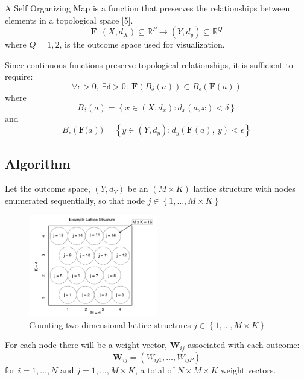 \documentclass[12pt,]{article}
\begin{document}
A Self Organizing Map is a function that preserves the relationships
between elements in a topological space {[}5{]}.
\[\mathbf{F}: (X, d_{X}) \subseteq \mathbb{R}^{P} \longrightarrow  (Y, d_{y}) \subseteq \mathbb{R}^{Q}\]
where \(Q=1,2\), is the outcome space used for visualization.

Since continuous functions preserve topological relationships, it is
sufficient to require:
\[\forall \epsilon>0, \ \exists \delta>0: \ \mathbf{F}\left(B_{\delta}\left(a\right) \right) \subset B_{\epsilon}\left(\mathbf{F}(a)\right)  \]
where
\[B_{\delta}\left(a\right)  = \left \{ x \in (X, d_{x}) : d_{x}\left(a,x \right) < \delta  \right \}\]
and
\[B_{\epsilon}\left(\mathbf{F}(a\right))  = \left \{ y \in (Y, d_{y}) : d_{y}\left(\mathbf{F}(a),\ y \right) < \epsilon  \right \}\]

\hypertarget{algorithm}{%
\subsection{Algorithm}\label{algorithm}}

Let the outcome space, \(\left(Y, d_{Y} \right)\) be an \((M \times K)\)
lattice structure with nodes enumerated sequentially, so that node
\(j \in \left \{ 1, \ldots, M \times K \right \}\)

\clearpage

\begin{figure}[!h]
\begin{center}
\includegraphics[width=0.5\textwidth]{LatticeEnumeration.jpg}
\end{center}
\caption[Lattice Enumeration Method]{Counting two dimensional lattice structures $j \in \left \{ 1, \ldots, M \times K     \right \}$}
\end{figure}

For each node there will be a weight vector, \(\mathbf{W}_{ij}\)
associated with each outcome:
\[\mathbf{W}_{ij}=\left(W_{ij1}, \ldots, W_{ijP} \right) \] for
\(i = 1, \ldots, N\) and \(j = 1, \ldots, M \times K\), a total of
\(N \times M \times K\) weight vectors.
\end{document}
